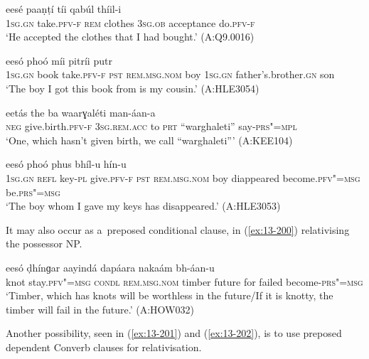 \begin{exe}
\ex
\label{ex:13-196}
 eesé paaṇṭí tíi qabúl  thíil-i \\
\textsc{1sg.gn} take.\textsc{pfv-f} \textsc{rem} clothes \textsc{3sg.ob} acceptance do.\textsc{pfv-f} \\
\glt `He accepted the clothes that I had bought.' (A:Q9.0016)

\ex
\label{ex:13-197}
 eesó phoó  míi pitríi putr \\
\textsc{1sg.gn} book take.\textsc{pfv-f} \textsc{pst} \textsc{rem.msg.nom} boy  \textsc{1sg.gn} father's.brother.\textsc{gn} son \\
\glt `The boy I got this book from is my cousin.' (A:HLE3054)

\ex
\label{ex:13-198}
\gll [na ǰéel-i] eetás the ba  waarɣaléti man-áan-a \\
\textsc{neg} give.birth.\textsc{pfv-f} \textsc{3sg.rem.acc} to \textsc{prt}  ``warghaleti'' say-\textsc{prs"=mpl} \\
\glt `One, which hasn't given birth, we call ``warghaleti''' (A:KEE104)

\ex
\label{ex:13-199}
 eesó  phoó phus bhíl-u hín-u  \\
\textsc{1sg.gn} \textsc{refl} key-\textsc{pl} give.\textsc{pfv-f} \textsc{pst} \textsc{rem.msg.nom}  boy diappeared become.\textsc{pfv"=msg} be.\textsc{prs"=msg} \\
\glt `The boy whom I gave my keys has disappeared.' (A:HLE3053) 
\end{exe}

It may also occur as a~preposed conditional clause, in (\ref{ex:13-200}) relativising the possessor NP.

\begin{exe}
\ex
\label{ex:13-200}
 eesó ḍhínɡar aayindá  dapáara nakaám bh-áan-u  \\
knot stay.\textsc{pfv"=msg} \textsc{condl} \textsc{rem.msg.nom} timber future  for failed become-\textsc{prs"=msg} \\
\glt `Timber, which has knots will be worthless in the future/If it is knotty, the timber will fail in the future.' (A:HOW032) 
\end{exe}

Another possibility, seen in (\ref{ex:13-201}) and (\ref{ex:13-202}), is to use preposed dependent Converb clauses for relativisation.

